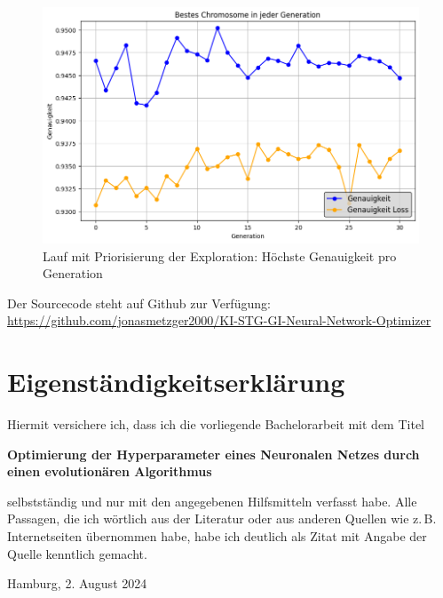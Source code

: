 \begin{figure}[p]
	\centering
	\includegraphics[width=1\linewidth]{acc.png}
	\caption{Lauf mit Priorisierung der Exploration: Höchste Genauigkeit pro Generation}
	\label{fig:enter-label}
\end{figure}


Der Sourcecode steht auf Github zur Verfügung:\\
\url{https://github.com/jonasmetzger2000/KI-STG-GI-Neural-Network-Optimizer}

\clearpage

\thispagestyle{empty}

\section*{Eigenständigkeitserklärung}

Hiermit versichere ich, dass ich die vorliegende Bachelorarbeit mit dem Titel
\begin{center}
  \textbf{Optimierung der Hyperparameter eines Neuronalen Netzes durch einen evolutionären Algorithmus}
\end{center}
selbstständig und nur mit den angegebenen Hilfsmitteln verfasst habe.  Alle
Passagen, die ich wörtlich aus der Literatur oder aus anderen Quellen wie
z.\,B. Internetseiten übernommen habe, habe ich deutlich als Zitat mit Angabe
der Quelle kenntlich gemacht.

\vspace{2cm}

Hamburg, 2. August 2024
